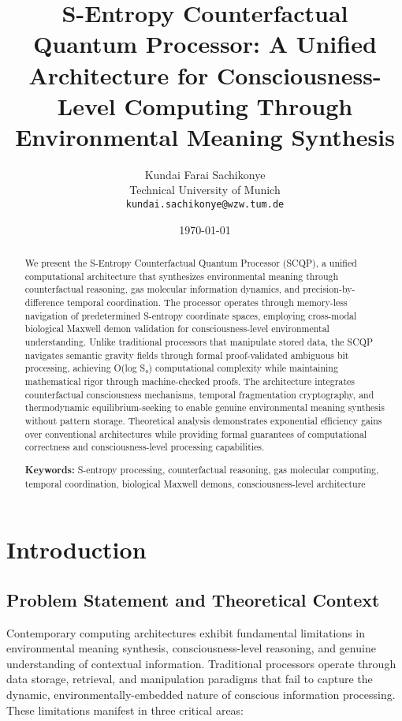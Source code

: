 \documentclass[12pt,a4paper]{article}
\title{\textbf{S-Entropy Counterfactual Quantum Processor: A Unified Architecture for Consciousness-Level Computing Through Environmental Meaning Synthesis}}
\author{
Kundai Farai Sachikonye\\
Technical University of Munich\\
\texttt{kundai.sachikonye@wzw.tum.de}
}
\date{\today}
\begin{document}
\maketitle

\begin{abstract}
We present the S-Entropy Counterfactual Quantum Processor (SCQP), a unified computational architecture that synthesizes environmental meaning through counterfactual reasoning, gas molecular information dynamics, and precision-by-difference temporal coordination. The processor operates through memory-less navigation of predetermined S-entropy coordinate spaces, employing cross-modal biological Maxwell demon validation for consciousness-level environmental understanding. Unlike traditional processors that manipulate stored data, the SCQP navigates semantic gravity fields through formal proof-validated ambiguous bit processing, achieving O(log S₀) computational complexity while maintaining mathematical rigor through machine-checked proofs. The architecture integrates counterfactual consciousness mechanisms, temporal fragmentation cryptography, and thermodynamic equilibrium-seeking to enable genuine environmental meaning synthesis without pattern storage. Theoretical analysis demonstrates exponential efficiency gains over conventional architectures while providing formal guarantees of computational correctness and consciousness-level processing capabilities.

\textbf{Keywords:} S-entropy processing, counterfactual reasoning, gas molecular computing, temporal coordination, biological Maxwell demons, consciousness-level architecture
\end{abstract}

\section{Introduction}

\subsection{Problem Statement and Theoretical Context}

Contemporary computing architectures exhibit fundamental limitations in environmental meaning synthesis, consciousness-level reasoning, and genuine understanding of contextual information. Traditional processors operate through data storage, retrieval, and manipulation paradigms that fail to capture the dynamic, environmentally-embedded nature of conscious information processing. These limitations manifest in three critical areas:
\end{document}
